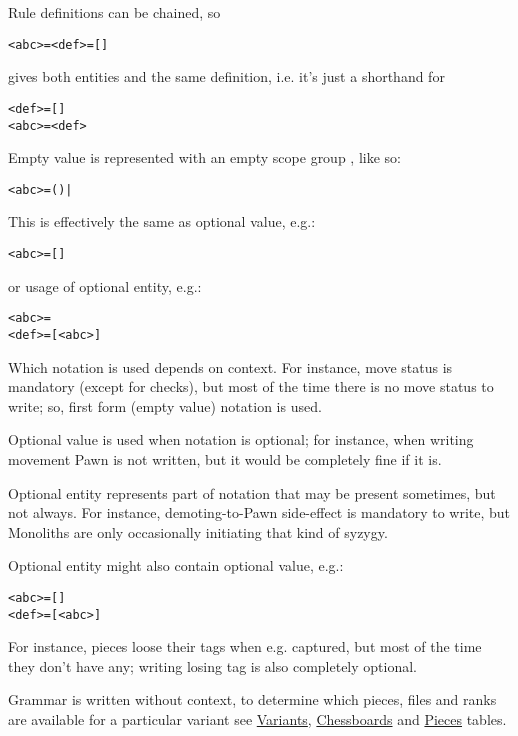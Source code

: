 Rule definitions can be chained, so
\begin{alltt}
<abc> = <def> =  [  ] 
\end{alltt}
gives both entities  and  the same definition,
i.e. it's just a shorthand for
\begin{alltt}
<def> =  [  ] 
<abc> = <def>
\end{alltt}

\clearpage %

Empty value is represented with an empty scope group \algfmt{()}, like so:
\begin{alltt}
<abc> = () | 
\end{alltt}

This is effectively the same as optional value, e.g.:
\begin{alltt}
<abc> = [  ]
\end{alltt}

or usage of optional entity, e.g.:
\begin{alltt}
<abc> = 
<def> =  [ <abc> ]
\end{alltt}
Which notation is used depends on context. For instance, move status is mandatory
(except for checks), but most of the time there is no move status to write; so,
first form (empty value) notation is used.

Optional value is used when notation is optional; for instance, when writing
movement Pawn is not written, but it would be completely fine if it is.

Optional entity represents part of notation that may be present sometimes, but
not always. For instance, demoting-to-Pawn side-effect is mandatory to write,
but Monoliths are only occasionally initiating that kind of syzygy.

Optional entity might also contain optional value, e.g.:
\begin{alltt}
<abc> = [  ]
<def> =  [ <abc> ]
\end{alltt}
For instance, pieces loose their tags when e.g. captured, but most of the time
they don't have any; writing losing tag is also completely optional.

Grammar is written without context, to determine which pieces, files and ranks
are available for a particular variant see
\hyperref[tbl:Appendix/Introduction/Variants]{Variants},
\hyperref[tbl:Appendix/Introduction/Chessboards]{Chessboards} and
\hyperref[tbl:Appendix/Introduction/Pieces]{Pieces} tables.

